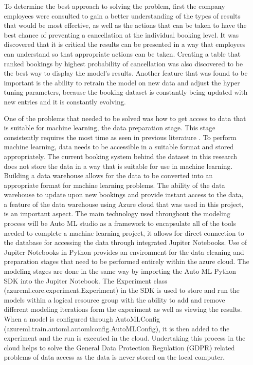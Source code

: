 \vspace{5mm}

To determine the best approach to solving the problem,  first the company employees were consulted to gain a better understanding of the types of results that would be most effective, as well as the actions that can be taken to have the best chance of preventing a cancellation at the individual booking level. It was discovered that it is critical the results can be presented in a way that employees can understand so that appropriate actions can be taken. Creating a table that ranked bookings by highest probability of cancellation was also discovered to be the best way to display the model's results. Another feature that was found to be important is the ability to retrain the model on new data and adjust the hyper tuning parameters, because the booking dataset is constantly being updated with new entries and it is constantly evolving.

\vspace{5mm}

One of the problems that needed to be solved was how to get access to data that is suitable for machine learning, the data preparation stage. This stage consistently requires the most time as seen in previous literature \cite{Zhang2003DataMining}. To perform machine learning, data needs to be accessible in a suitable format and stored appropriately. The current booking system behind the dataset in this research does not store the data in a way that is suitable for use in machine learning. Building a data warehouse allows for the data to be converted into an appropriate format for machine learning problems. The ability of the data warehouse to update upon new bookings and provide instant access to the data, a feature of the data warehouse using Azure cloud that was used in this project, is an important aspect. The main technology used throughout the modeling process will be Auto ML studio as a framework to encapsulate all of the tools needed to complete a machine learning project, it allows for direct connection to the database for accessing the data through integrated Jupiter Notebooks. Use of Jupiter Notebooks in Python provides an environment for the data cleaning and preparation stages that need to be performed entirely within the azure cloud. The modeling stages are done in the same way by importing the Auto ML Python SDK into the Jupiter Notebook. The Experiment class (azureml.core.experiment.Experiment) in the SDK is used to store and run the models within a logical resource group with the ability to add and remove different modeling iterations form the experiment as well as viewing the results. When a model is configured through AutoMLConfig (azureml.train.automl.automlconfig.AutoMLConfig), it is then added to the experiment and the run is executed in the cloud. Undertaking this process in the cloud helps to solve the General Data Protection Regulation (GDPR) related problems of data access as the data is never stored on the local computer.


